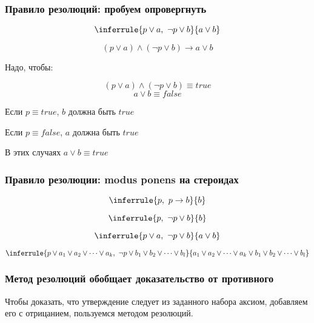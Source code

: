 \documentclass{beamer}
\begin{document}
\begin{frame}[fragile]
  \frametitle{Правило резолюций: пробуем опровергнуть}
  \[\inferrule{p \vee a, \ \neg p \vee b}{a \vee b}\]

\[
  (p \vee a) \wedge (\neg p \vee b) \to a \vee b
\]
\begin{center}
Надо, чтобы:
\end{center}
\[
  (p \vee a) \wedge (\neg p \vee b) \equiv true
\]
\[
  a \vee b \equiv false
\]


\begin{center}
  Если $p \equiv true$, $b$ должна быть $true$

  Если $p \equiv false$, $a$ должна быть $true$

  В этих случаях $a \vee b \equiv true$
\end{center}

\end{frame}

\begin{frame}[fragile]
  \frametitle{Правило резолюции: modus ponens на стероидах}
  \[\inferrule{p, \ p \to b}{b}\]

  \[\inferrule{p, \ \neg p \vee b}{b}\]

  \[\inferrule{p \vee a, \ \neg p \vee b}{a \vee b}\]

  \[\inferrule{p \vee a_1 \vee a_2 \vee \dots \vee a_k, \ \neg p \vee b_1 \vee b_2 \vee \dots \vee b_l}{a_1 \vee a_2 \vee \dots \vee a_k \vee b_1 \vee b_2 \vee \dots \vee b_l}\]
\end{frame}

\begin{frame}[fragile]
  \frametitle{Метод резолюций обобщает доказательство от противного}
Чтобы доказать, что утверждение следует из заданного набора аксиом, добавляем его с отрицанием, пользуемся методом резолюций.
\end{frame}
\end{document}
